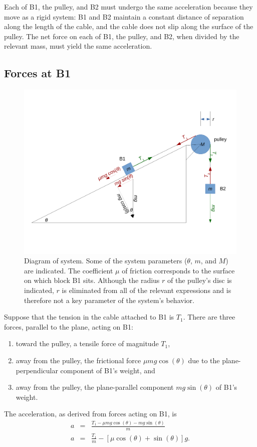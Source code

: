 \documentclass[twocolumn]{article}
\begin{document}
Each of B1, the pulley, and B2 must undergo the same acceleration because they
move as a rigid system: B1 and B2 maintain a constant distance of separation
along the length of the cable, and the cable does not slip along the surface of
the pulley.  The net force on each of B1, the pulley, and B2, when divided by
the relevant mass, must yield the same acceleration.

\subsection{Forces at B1}

\begin{figure}
   \begin{center}
      \includegraphics[width=0.95\columnwidth]{diagram}
   \end{center}
   \caption{Diagram of system. Some of the system parameters ($\theta$, $m$,
   and $M$) are indicated. The coefficient $\mu$ of friction corresponds to the
   surface on which block B1 sits. Although the radius $r$ of the pulley's disc
   is indicated, $r$ is eliminated from all of the relevant expressions and is
   therefore not a key parameter of the system's behavior.}
   \label{fig:diagram}
\end{figure}

Suppose that the tension in the cable attached to B1 is $T_1$. There are three
forces, parallel to the plane, acting on B1:
\begin{enumerate}
      \item toward the pulley, a tensile force of magnitude $T_1$,
      \item away from the pulley, the frictional force $\mu m g \cos(\theta)$
         due to the plane-perpendicular component of B1's weight, and
      \item away from the pulley, the plane-parallel component $m g
         \sin(\theta)$ of B1's weight.
\end{enumerate}
The acceleration, as derived from forces acting on B1, is
\begin{eqnarray}
   \nonumber
   a &=& \frac{T_1 - \mu m g \cos(\theta) - m g \sin(\theta)}{m}\\
   a &=& \tfrac{T_1}{m} - [\mu \cos(\theta) + \sin(\theta)] g.
   \label{eq:B1}
\end{eqnarray}
\end{document}
